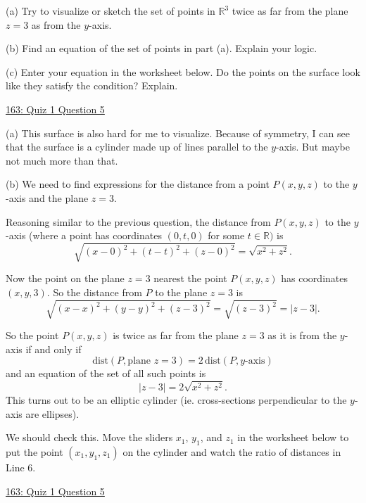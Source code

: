 \documentclass{ximera}
\begin{document}
\begin{question}  \label{Qpdfdsfe032}
(a) Try to visualize or sketch the set of points in $\mathbb{R}^3$  twice as far from the plane $z=3$ as from the $y$-axis. 

(b) Find an equation of the set of points in part (a). Explain your logic.

(c) Enter  your equation in the worksheet below. Do the points on the surface look like they satisfy the condition? Explain.

\begin{onlineOnly}
    \begin{center}
\end{center}
\end{onlineOnly}

\href{https://www.desmos.com/3d/qvin80o05t}{163: Quiz 1 Question 5}


\begin{explanation}
(a) This surface is also hard for me to visualize. Because of symmetry, I can see that the surface is a cylinder made up of lines parallel to the $y$-axis. But maybe not much more than that.

(b) We need to find expressions for the distance from a point $P(x,y,z)$ to the $y$-axis and the plane $z=3$. 

Reasoning similar to the previous question, the distance from $P(x,y,z)$ to the $y$-axis (where a point has coordinates $(0,t,0)$ for some $t\in \mathbb{R})$ is
\[
         \sqrt{(x-0)^2 + (t-t)^2 + (z-0)^2} = \sqrt{x^2 + z^2} .
\] 

Now the point on the plane $z=3$ nearest the point $P(x,y,z)$ has coordinates $(x,y,3)$. So the distance from $P$ to the plane $z=3$ is
\[
   \sqrt{(x-x)^2 + (y-y)^2 + (z-3)^2} = \sqrt{(z-3)^2}  = |  z - 3 |.
\]

So the point $P(x,y,z)$ is twice as far from the plane $z=3$ as it is from the $y$-axis if and only if 
\[
     \text{dist}(P, \text{plane } z= 3) = 2\, \text{dist}(P, y\text{-axis}) 
\]
and an equation of the set of all such points is
\[
         |  z - 3 |    = 2  \sqrt{x^2 + z^2}.
\]
This turns out to be an elliptic cylinder (ie. cross-sections perpendicular to the $y$-axis are ellipses).

We should check this. Move the sliders $x_1$, $y_1$, and $z_1$ in the worksheet below to put the point $(x_1, y_1, z_1)$ on the cylinder and watch the ratio of distances in Line 6.

\begin{onlineOnly}
    \begin{center}
\end{center}
\end{onlineOnly}

\href{https://www.desmos.com/3d/sdwtgkxidi}{163: Quiz 1 Question 5}

\end{explanation}


\end{question}
\end{document}
